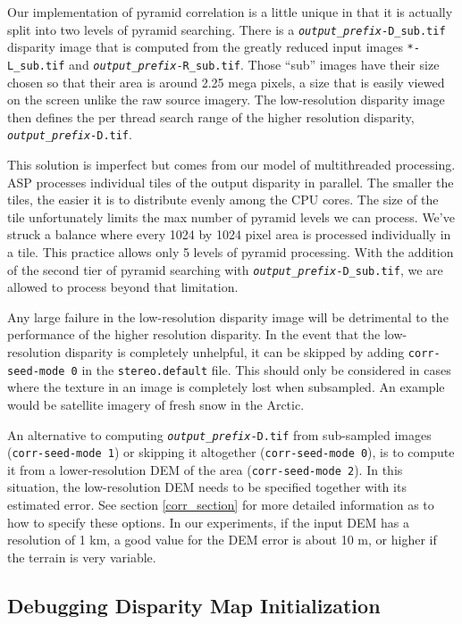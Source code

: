 Our implementation of pyramid correlation is a little unique in that
it is actually split into two levels of pyramid searching. There is a
\texttt{\textit{output\_prefix}-D\_sub.tif} disparity image that is
computed from the greatly reduced input images \texttt{*-L\_sub.tif}
and \texttt{\textit{output\_prefix}-R\_sub.tif}. Those ``sub'' images
have their size chosen so that their area is around 2.25 mega pixels,
a size that is easily viewed on the screen unlike the raw source
imagery. The low-resolution disparity image then defines the per
thread search range of the higher resolution disparity,
\texttt{\textit{output\_prefix}-D.tif}.

This solution is imperfect but comes from our model of multithreaded
processing. ASP processes individual tiles of the output disparity
in parallel. The smaller the tiles, the easier it is to distribute
evenly among the CPU cores. The size of the tile unfortunately
limits the max number of pyramid levels we can process. We've struck
a balance where every 1024 by 1024 pixel area is processed individually
in a tile. This practice allows only 5 levels of pyramid processing.
With the addition of the second tier of pyramid searching with
\texttt{\textit{output\_prefix}-D\_sub.tif}, we are allowed to
process beyond that limitation.

Any large failure in
the low-resolution disparity image will be detrimental to the
performance of the higher resolution disparity. In the event that the
low-resolution disparity is completely unhelpful, it can be skipped by
adding \texttt{corr-seed-mode 0} in the \texttt{stereo.default}
file. This should only be considered in cases where the texture in an
image is completely lost when subsampled. An example would be
satellite imagery of fresh snow in the Arctic.

An alternative to computing \texttt{\textit{output\_prefix}-D.tif}
from sub-sampled images (\texttt{corr-seed-mode 1}) or skipping it
altogether (\texttt{corr-seed-mode 0}), is to compute it from a
lower-resolution DEM of the area (\texttt{corr-seed-mode 2}). In this
situation, the low-resolution DEM needs to be specified together with its estimated
error. See section \ref{corr_section} for more detailed information as
to how to specify these options. In our experiments, if the input DEM
has a resolution of 1 km, a good value for the DEM error is about 10 m,
or higher if the terrain is very variable.

\subsection{Debugging Disparity Map Initialization}

